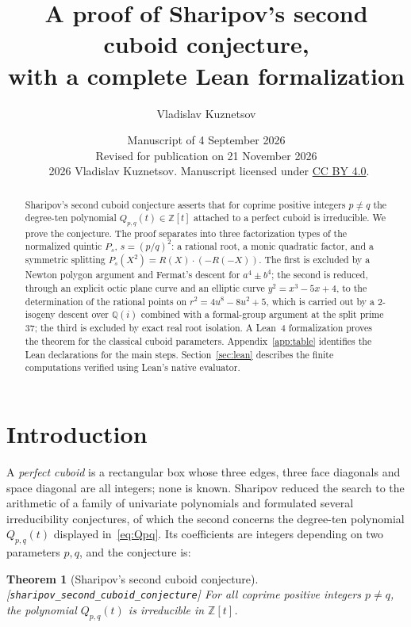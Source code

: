 \documentclass[10pt]{article}
\title{A proof of Sharipov's second cuboid conjecture,\\
with a complete Lean formalization}
\author{Vladislav Kuznetsov}
\date{Manuscript of 4 September 2026\\[2pt]
  \small Revised for publication on 21 November 2026\\[2pt]
  \footnotesize \textcopyright~2026 Vladislav Kuznetsov. Manuscript licensed under
  \href{https://creativecommons.org/licenses/by/4.0/}{CC BY 4.0}.}
\newtheorem{theorem}{Theorem}[section]
\theoremstyle{definition}
\theoremstyle{remark}
\newcommand{\Q}{\mathbb{Q}}
\newcommand{\Z}{\mathbb{Z}}
\newcommand{\leanref}[1]{{\scriptsize\textup{[\texttt{#1}]}}\allowbreak}
\begin{document}
\maketitle

\begin{abstract}
Sharipov's second cuboid conjecture asserts that for coprime positive integers
$p\neq q$ the degree-ten polynomial $Q_{p,q}(t)\in\Z[t]$ attached to a
perfect cuboid is irreducible.  We prove the conjecture.  The proof separates
into three factorization types of the normalized quintic $P_s$,
$s=(p/q)^2$: a rational root, a monic quadratic factor, and a symmetric
splitting $P_s(X^2)=R(X)\cdot(-R(-X))$.  The first is excluded by a Newton
polygon argument and Fermat's descent for $a^4\pm b^4$; the second is
reduced, through an explicit octic plane curve and an elliptic curve
$y^2=x^3-5x+4$, to the determination of the rational points on
$r^2=4u^8-8u^2+5$, which is carried out by a $2$-isogeny descent over
$\Q(i)$ combined with a formal-group argument at the split prime $37$; the
third is excluded by exact real root isolation.  A Lean~4 formalization proves the theorem for the
classical cuboid parameters. Appendix~\ref{app:table} identifies the Lean
declarations for the main steps. Section~\ref{sec:lean} describes the finite
computations verified using Lean's native evaluator.
\end{abstract}


\section{Introduction}\label{sec:intro}

A \emph{perfect cuboid} is a rectangular box whose three edges, three face
diagonals and space diagonal are all integers; none is known.  Sharipov
\cite{Sharipov2011,Sharipov2012} reduced the search to the arithmetic of a
family of univariate polynomials and formulated several irreducibility
conjectures, of which the second concerns the degree-ten polynomial
$Q_{p,q}(t)$ displayed in~\eqref{eq:Qpq}.  Its coefficients are integers
depending on two parameters $p,q$, and the conjecture is:

\begin{theorem}[Sharipov's second cuboid conjecture]\label{thm:main}
\leanref{sharipov\_\allowbreak second\_\allowbreak cuboid\_\allowbreak conjecture}
For all coprime positive integers $p\ne q$, the polynomial $Q_{p,q}(t)$ is
irreducible in $\Z[t]$.
\end{theorem}
\end{document}
